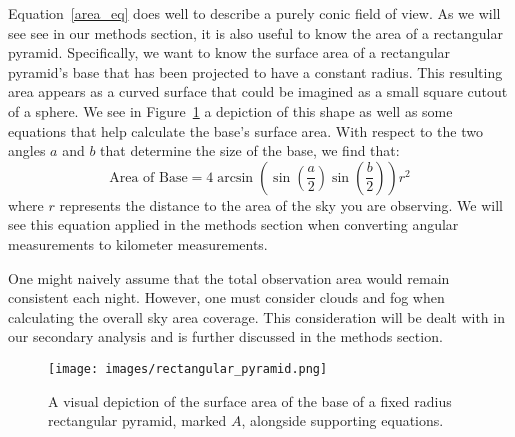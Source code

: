 Equation~\ref{area_eq} does well to describe a purely conic field of view.
As we will see see in our methods section, it is also useful to know the area of a rectangular pyramid.
Specifically, we want to know the surface area of a rectangular pyramid's base that has been projected to have a constant radius. 
This resulting area appears as a curved surface that could be imagined as a small square cutout of a sphere.
We see in Figure~\ref{useful_area_equation} a depiction of this shape as well as some equations that help calculate the base's surface area.
With respect to the two angles $a$ and $b$ that determine the size of the base, we find that:
\begin{equation}
    \text{Area of Base} = 
    4 \arcsin{(\sin{(\frac{a}{2})}\sin{(\frac{b}{2})})} r^2
    \label{small_area_eq}
\end{equation}
where $r$ represents the distance to the area of the sky you are observing.
We will see this equation applied in the methods section when converting angular measurements to kilometer measurements.

One might naively assume that the total observation area would remain consistent each night.
However, one must consider clouds and fog when calculating the overall sky area coverage.
This consideration will be dealt with in our secondary analysis and is further discussed in the methods section.


\begin{figure}[ht!]
  \centering
  \texttt{[image: images/rectangular\_pyramid.png]}
  \caption{A visual depiction of the surface area of the base of a fixed radius rectangular pyramid, marked $A$, alongside supporting equations. }
  \label{useful_area_equation}
\end{figure}
